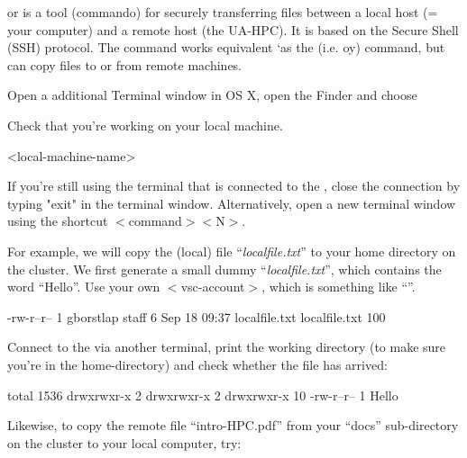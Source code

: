 or  is a tool (commando) for securely
transferring files between a local host (= your computer) and a remote host
(the UA-HPC). It is based on the Secure Shell (SSH) protocol.  The 
command works equivalent `as the   (i.e. oy)
command, but can copy files to or from remote machines.

Open a additional Terminal window in OS X, open the Finder and choose


Check that you're working on your local machine.

\begin{prompt}
<local-machine-name>
\end{prompt}

If you're still using the terminal that is connected to the \hpc, close the
connection by typing "exit" in the terminal window. Alternatively, open a new
terminal window using the shortcut $<$command$>$$<$N$>$.

For example, we will copy the (local) file ``\emph{localfile.txt}'' to your
home directory on the \hpc cluster. We first generate a small dummy
``\emph{localfile.txt}'', which contains the word ``Hello''.  Use your own
$<$vsc-account$>$, which is something like ``\emph{\userid}''.

\begin{prompt}
-rw-r--r-- 1 gborstlap  staff   6 Sep 18 09:37 localfile.txt
localfile.txt    100%
\end{prompt}

Connect to the \hpc via another terminal, print the working directory (to make
sure you're in the home-directory) and check whether the file has arrived:

\begin{prompt}
total 1536
drwxrwxr-x  2 %
drwxrwxr-x  2 %
drwxrwxr-x 10 %
-rw-r--r--  1 %
Hello
\end{prompt}

Likewise, to copy the remote file ``intro-HPC.pdf'' from your ``docs''
sub-directory on the cluster to your local computer, try:

